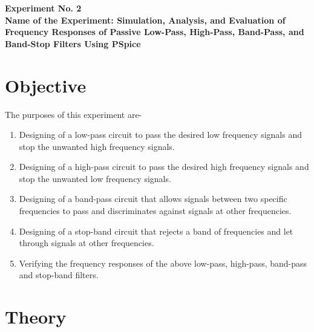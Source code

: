 \documentclass[12pt,a4paper]{article}
\newcommand{\expnumber}{2}
\begin{document}
	
	
	
	
	
	\begin{center}
		{\large\bfseries Experiment No. \expnumber}\\[4pt]
		{\large\bfseries Name of the Experiment: Simulation, Analysis, and
			Evaluation of Frequency Responses of Passive Low-Pass, High-Pass,
			Band-Pass, and Band-Stop Filters Using PSpice}
	\end{center}
	\vspace{6pt}
	
	\section{Objective}
	The purposes of this experiment are-
	\begin{enumerate}[label=\arabic*.]
		\item Designing of a low-pass circuit to pass the desired low frequency signals and stop the unwanted high frequency signals.
		\item Designing of a high-pass circuit to pass the desired high frequency signals and stop the unwanted low frequency signals.
		\item Designing of a band-pass circuit that allows signals between two specific frequencies to pass and discriminates against signals at other frequencies.
		\item Designing of a stop-band circuit that rejects a band of frequencies and let through signals at other frequencies.
		\item Verifying the frequency responses of the above low-pass, high-pass, band-pass and stop-band filters.
	\end{enumerate}
	\section{Theory}
	
\end{document}
